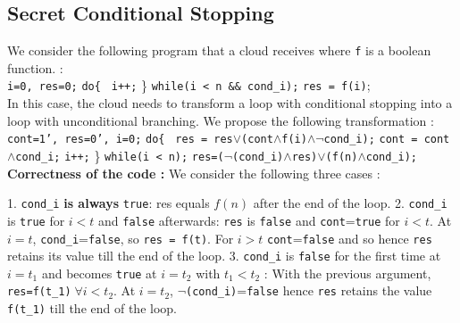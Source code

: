 \documentclass{acm_proc_article-sp}
\begin{document}
\subsection{Secret Conditional Stopping}
We consider the following program that a cloud receives where \texttt{f} is a boolean function. : \\
 \phantom{x} \texttt{i=0, res=0;}
\newline \phantom{x} \texttt{do\{ }
\newline \phantom{x} \hspace{9ex} \texttt{i++;} 
\newline   \phantom{x} \} \texttt{while(i < n \&\& cond\_i);} 
\newline  \phantom{x} \texttt{res = f(i)};\\
In this case, the cloud needs to transform a loop with conditional stopping into a loop with unconditional branching. We propose the following transformation : \\
 \phantom{x} \texttt{cont=1', res=0', i=0;}
\newline \phantom{x} \texttt{do\{ }
\newline \phantom{x} \hspace{6ex} \texttt{res = res$\vee$(cont$\wedge$f(i)$\wedge\neg$cond\_i);}
\newline \phantom{x} \hspace{6ex} \texttt{cont = cont$\wedge$cond\_i;}
\newline \phantom{x} \hspace{6ex} \texttt{i++;} 
\newline   \phantom{x} \} \texttt{while(i < n);} 
\newline \phantom{x} \texttt{res=($\neg$(cond\_i)$\wedge$res)$\vee$(f(n)$\wedge$cond\_i);}
\newline 
\textbf{Correctness of the code :} We consider the following three cases :
 
1. \texttt{cond\_i} \textbf{is always} \texttt{true}: res equals $f(n)$ after the end of the loop.\newline
\phantom{x} 2. \texttt{cond\_i} is \texttt{true} for $i<t$ and \texttt{false} afterwards: \texttt{res} is \texttt{false} and \texttt{cont}=\texttt{true} for $i<t$. At $i=t$, \texttt{cond\_i}=\texttt{false}, so \texttt{res = f(t)}. For $i>t$ \texttt{cont}=\texttt{false} and so hence \texttt{res} retains its value till the end of the loop. \newline  
\phantom{x} 3. \texttt{cond\_i} is \texttt{false} for the first time at $i=t_1$ and becomes \texttt{true} at $i=t_2$ with $t_1<t_2$ : With the previous argument, \texttt{res=f(t\_1)}$\; \forall i<t_2$. At $i=t_2$, \texttt{$\neg$(cond\_i)}=\texttt{false} hence \texttt{res} retains the value \texttt{f(t\_1)} till the end of the loop.
 
\end{document}
